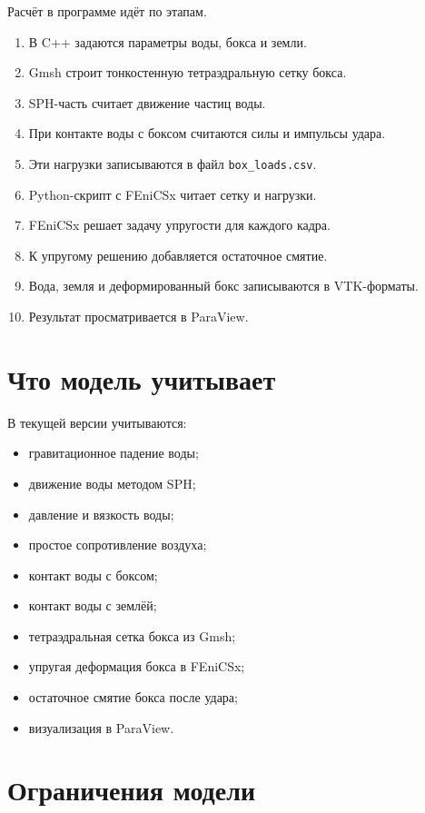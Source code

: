 \documentclass[12pt,a4paper]{article}
\begin{document}
Расчёт в программе идёт по этапам.

\begin{enumerate}
  \item В C++ задаются параметры воды, бокса и земли.
  \item Gmsh строит тонкостенную тетраэдральную сетку бокса.
  \item SPH-часть считает движение частиц воды.
  \item При контакте воды с боксом считаются силы и импульсы удара.
  \item Эти нагрузки записываются в файл \texttt{box\_loads.csv}.
  \item Python-скрипт с FEniCSx читает сетку и нагрузки.
  \item FEniCSx решает задачу упругости для каждого кадра.
  \item К упругому решению добавляется остаточное смятие.
  \item Вода, земля и деформированный бокс записываются в VTK-форматы.
  \item Результат просматривается в ParaView.
\end{enumerate}

\section{Что модель учитывает}

В текущей версии учитываются:

\begin{itemize}
  \item гравитационное падение воды;
  \item движение воды методом SPH;
  \item давление и вязкость воды;
  \item простое сопротивление воздуха;
  \item контакт воды с боксом;
  \item контакт воды с землёй;
  \item тетраэдральная сетка бокса из Gmsh;
  \item упругая деформация бокса в FEniCSx;
  \item остаточное смятие бокса после удара;
  \item визуализация в ParaView.
\end{itemize}

\section{Ограничения модели}
\end{document}
